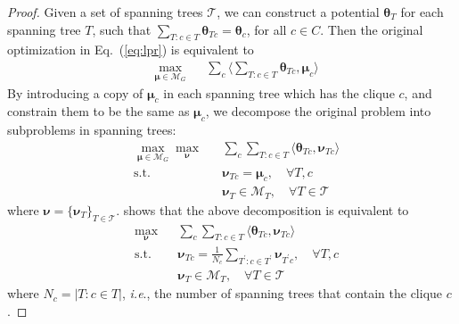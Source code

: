 \documentclass[conference]{IEEEtran}
\def\ie{\emph{i.e}.} \def\Ie{\emph{I.e}.}
\newcommand{\mM}{\mathcal{M}}
\newcommand{\mT}{\mathcal{T}}
\newcommand{\mth}{\mathbf{\boldsymbol \theta}}
\newcommand{\mmu}{\mathbf{\boldsymbol \mu}}
\newcommand{\mnu}{\mathbf{\boldsymbol \nu}}
\newcommand{\la}{\langle}
\newcommand{\ra}{\rangle}
\newcommand{\cinT}{T : c \in T}
\newcommand{\cinTp}{T^\prime : c \in T^\prime}
\begin{document}
\begin{proof}
	Given a set of spanning trees $\mT$, we can construct a potential $\mth_T$ for each spanning tree $T$, such that $\sum_{\cinT} \mth_{Tc} = \mth_c$, for all $c \in C$. Then the original optimization in Eq.~(\ref{eq:lpr}) is equivalent to 
\begin{equation}
\begin{aligned}
	&\max_{\mmu \in \mM_G} && \sum_c \la \sum_{\cinT} \mth_{Tc}, \mmu_{c} \ra 
\end{aligned}
\end{equation}
By introducing a copy of $\mmu_{c}$ in each spanning tree which has the clique $c$, and constrain them to be the same as $\mmu_c$, we decompose the original problem into subproblems in spanning trees:
\begin{equation}
\begin{aligned}
	&\max_{\mmu \in \mM_G} \max_{\mnu} && \sum_c \sum_{\cinT} \la \mth_{Tc}, \mnu_{Tc} \ra \\
	&\textrm{s.t.} && \mnu_{Tc} = \mmu_c, \quad \forall T,c \\
	&&& \mnu_T \in \mM_T, \quad \forall T \in \mT
\end{aligned}
\end{equation}
where $\mnu = \{\mnu_T\}_{T \in \mT}$. \cite{Domke11} shows that the above decomposition is equivalent to 
\begin{equation}
\begin{aligned}
	&\max_{\mnu} && \sum_c \sum_{\cinT} \la \mth_{Tc}, \mnu_{Tc} \ra \\
	&\textrm{s.t.} && \mnu_{Tc} = \frac{1}{N_c} \sum_{\cinTp} \mnu_{T^\prime c}, \quad \forall T,c \\
	&&& \mnu_T \in \mM_T, \quad \forall T \in \mT
\end{aligned}
\end{equation}
where $N_c = | T \colon c \in T |$, \ie, the number of spanning trees that contain the clique $c$. 


\end{proof}
\end{document}
